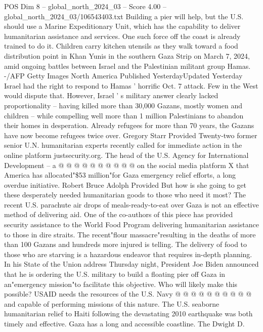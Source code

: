 \begin{textsample}{POS Dim 8 – global\_north\_2024\_03 – Score 4.00 – global\_north\_2024\_03/106543403.txt}  \label{ex:f8_pos_225}
Building a pier will help, but the U.S. should use a Marine Expeditionary Unit, which has the capability to deliver humanitarian assistance and services.
One such force off the coast is already trained to do it.
Children carry kitchen utensils as they walk toward a food distribution point in Khan Yunis in the southern Gaza Strip on March 7, 2024, amid ongoing battles between Israel and the Palestinian militant group Hamas. -/AFP Getty Images North America Published YesterdayUpdated Yesterday Israel had the right to respond to Hamas ' horrific Oct. 7 attack.
Few in the West would dispute that.
However, Israel ' s military answer clearly lacked proportionality -- having killed more than 30,000 Gazans, mostly women and children -- while compelling well more than 1 million Palestinians to abandon their homes in desperation.
Already refugees for more than 70 years, the Gazans have now become refugees twice over.
Gregory Starr Provided Twenty-two former senior U.N. humanitarian experts recently called for immediate action in the online platform justsecurity.org.
The head of the U.S.
Agency for International Development -- a @ @ @ @ @ @ @ @ @ @ on the social media platform X that America has allocated"\$53 million"for Gaza emergency relief efforts, a long overdue initiative.
Robert Bruce Adolph Provided But how is she going to get these desperately needed humanitarian goods to those who need it most?
The recent U.S. parachute air drops of meals-ready-to-eat over Gaza is not an effective method of delivering aid.
One of the co-authors of this piece has provided security assistance to the World Food Program delivering humanitarian assistance to those in dire straits.
The recent"flour massacre"resulting in the deaths of more than 100 Gazans and hundreds more injured is telling.
The delivery of food to those who are starving is a hazardous endeavor that requires in-depth planning.
In his State of the Union address Thursday night, President Joe Biden announced that he is ordering the U.S. military to build a floating pier off Gaza in an"emergency mission"to facilitate this objective.
Who will likely make this possible?
USAID needs the resources of the U.S.
Navy @ @ @ @ @ @ @ @ @ @ and capable of performing missions of this nature.
The U.S. seaborne humanitarian relief to Haiti following the devastating 2010 earthquake was both timely and effective.
Gaza has a long and accessible coastline.
The Dwight D.

\end{textsample}
